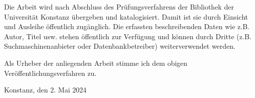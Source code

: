 \documentclass[
	twoside,
	parskip=half,
	a4paper,
]{scrbook}
\begin{document}
Die Arbeit wird nach Abschluss des Prüfungsverfahrens der Bibliothek der Universität Konstanz
übergeben und katalogisiert. Damit ist sie durch Einsicht und Ausleihe öffentlich zugänglich. Die
erfassten beschreibenden Daten wie z.B. Autor, Titel usw. stehen öffentlich zur Verfügung und können
durch Dritte (z.B. Suchmaschinenanbieter oder Datenbankbetreiber) weiterverwendet werden.

Als Urheber der anliegenden Arbeit stimme ich dem obigen Veröffentlichungsverfahren zu.

Konstanz, den 2. Mai 2024
\end{document}
